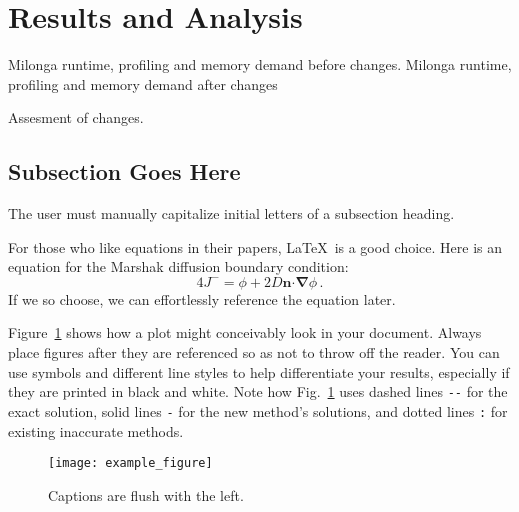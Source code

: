 \documentclass{anstrans}
\renewcommand{\vec}[1]{\bm{#1}} %
\newcommand{\vd}{\bm{\cdot}} %
\newcommand{\grad}{\vec{\nabla}} %
\newcommand{\ud}{\mathop{}\!\mathrm{d}} %
\begin{document}

\section{Results and Analysis}

Milonga runtime, profiling and memory demand before changes.
Milonga runtime, profiling and memory demand after changes

Assesment of changes.

\subsection{Subsection Goes Here}
The user must manually capitalize initial letters of a subsection heading.

For those who like equations in their papers, \LaTeX\ is a good choice. Here is
an equation for the Marshak diffusion boundary condition:
\begin{equation} \label{eq:marshak}
  4 J^- = \phi + 2 D \vec{n} \vd \grad \phi \,.
\end{equation}
If we so choose, we can effortlessly reference the equation later.

Figure~\ref{fig:voltage} shows how a plot might conceivably look in your
document. Always place figures after they are referenced so as not to throw
off the reader. You can use symbols and different line styles to help
differentiate your results, especially if they are printed in black and white.
Note how Fig.~\ref{fig:voltage} uses dashed lines \verb|--| for the exact
solution, solid lines \verb|-| for the new method's solutions, and dotted lines
\verb|:| for existing inaccurate methods.
\begin{figure}[ht] %
  \centering
  \texttt{[image: example\_figure]}
  \caption{Captions are flush with the left.}
  \label{fig:voltage}
\end{figure}
\end{document}

